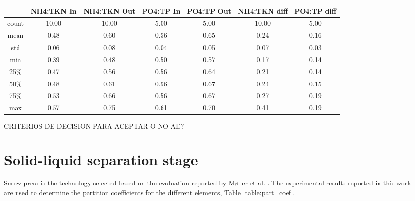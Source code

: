 \documentclass[10pt,a4paper]{article}
\begin{document}
\begin{table}[H] 
\centering
\begin{tabular}{ccccccc}
	\toprule
	{} &  NH4:TKN In &  		NH4:TKN Out &  		PO4:TP In &  	   PO4:TP Out &  NH4:TKN diff &  PO4:TP diff\\
	\midrule
		count&  	      10.00 &             10.00 &             5.00 &             5.00 &         10.00 &         5.00 \\
		mean&       0.48 &              0.60 &             0.56 &             0.65 &          0.24 &         0.16 \\
		std&        0.06 &              0.08 &             0.04 &             0.05 &          0.07 &         0.03 \\
		min&          0.39 &              0.48 &             0.50 &             0.57 &          0.17 &         0.14 \\
		25\%  &        0.47 &              0.56 &             0.56 &             0.64 &          0.21 &         0.14 \\
		50\% &         0.48 &              0.61 &             0.56 &             0.67 &          0.24 &         0.15 \\
		75\%&        0.53 &              0.66 &             0.56 &             0.67 &          0.27 &         0.19 \\
		max&         0.57 &              0.75 &             0.61 &             0.70 &          0.41 &         0.19 \\
	\bottomrule
\end{tabular}
\end{table}

CRITERIOS DE DECISION PARA ACEPTAR O NO AD?


\section{Solid-liquid separation stage}
Screw press is the technology selected based on the evaluation reported by M{\o}ller et al. \cite{MollerSLsep}. The experimental results reported in this work are used to determine the partition coefficients for the different elements, Table \ref{table:part_coef}.
\end{document}
